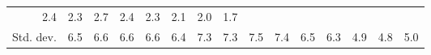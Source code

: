 \begin{tabular}{lllllllllllllll}
  \multicolumn{1}{r}{2.4} &
  \multicolumn{1}{r}{2.3} &
  \multicolumn{1}{r}{2.7} &
  \multicolumn{1}{r}{2.4} &
  \multicolumn{1}{r}{2.3} &
  \multicolumn{1}{r}{2.1} &
  \multicolumn{1}{r}{2.0} &
  \multicolumn{1}{r}{1.7} \\
\multicolumn{1}{l}{\hspace{2em}Std. dev.} &
  \multicolumn{1}{|r}{6.5} &
  \multicolumn{1}{r}{6.6} &
  \multicolumn{1}{r}{6.6} &
  \multicolumn{1}{r}{6.6} &
  \multicolumn{1}{r}{6.4} &
  \multicolumn{1}{r}{7.3} &
  \multicolumn{1}{r}{7.3} &
  \multicolumn{1}{r}{7.5} &
  \multicolumn{1}{r}{7.4} &
  \multicolumn{1}{r}{6.5} &
  \multicolumn{1}{r}{6.3} &
  \multicolumn{1}{r}{4.9} &
  \multicolumn{1}{r}{4.8} &
  \multicolumn{1}{r}{5.0} \\
\cline{1-15}
\end{tabular}
